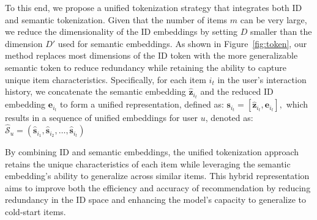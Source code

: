 To this end, we propose a unified tokenization strategy that integrates both ID and semantic tokenization. Given that the number of items \( m \) can be very large, we reduce the dimensionality of the ID embeddings by setting \( D \) smaller than the dimension \( D' \) used for semantic embeddings. As shown in Figure~\ref{fig:token}, our method replaces most dimensions of the ID token with the more generalizable semantic token to reduce redundancy while retaining the ability to capture unique item characteristics. Specifically, for each item \( i_t \) in the user’s interaction history, we concatenate the semantic embedding \( \hat{\boldsymbol{z}}_{i_t} \) and the reduced ID embedding \( \boldsymbol{e}_{i_t} \) to form a unified representation, defined as:
\(
\boldsymbol{s}_{i_t} = [\hat{\boldsymbol{z}}_{i_t}, \boldsymbol{e}_{i_t}],
\)
which results in a sequence of unified embeddings for user \( u \), denoted as:
\(
\hat{\mathcal{S}}_{u} = (\hat{\boldsymbol{s}}_{i_{1}}, \hat{\boldsymbol{s}}_{i_{2}}, \ldots, \hat{\boldsymbol{s}}_{i_{t}})
\)

By combining ID and semantic embeddings, the unified tokenization approach retains the unique characteristics of each item while leveraging the semantic embedding's ability to generalize across similar items. This hybrid representation aims to improve both the efficiency and accuracy of recommendation by reducing redundancy in the ID space and enhancing the model's capacity to generalize to cold-start items.






